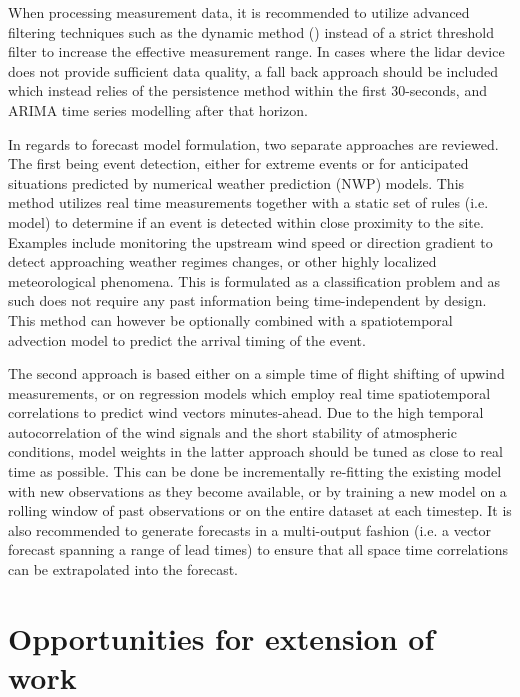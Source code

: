 When processing measurement data, it is recommended to utilize advanced filtering techniques such as the dynamic method (\cite{beck_dynamic_2017}) instead of a strict threshold filter to increase the effective measurement range. In cases where the lidar device does not provide sufficient data quality, a fall back approach should be included which instead relies of the persistence method within the first 30-seconds, and ARIMA time series modelling after that horizon.

In regards to forecast model formulation, two separate approaches are reviewed. The first being event detection, either for extreme events or for anticipated situations predicted by numerical weather prediction (NWP) models. This method utilizes real time measurements together with a static set of rules (i.e. model) to determine if an event is detected within close proximity to the site. Examples include monitoring the upstream wind speed or direction gradient to detect approaching weather regimes changes, or other highly localized meteorological phenomena. This is formulated as a classification problem and as such does not require any past information being time-independent by design. This method can however be optionally combined with a spatiotemporal advection model to predict the arrival timing of the event.

The second approach is based either on a simple time of flight shifting of upwind measurements, or on regression models which employ real time spatiotemporal correlations to predict wind vectors minutes-ahead. Due to the high temporal autocorrelation of the wind signals and the short stability of atmospheric conditions, model weights in the latter approach should be tuned as close to real time as possible. This can be done be incrementally re-fitting the existing model with new observations as they become available, or by training a new model on a rolling window of past observations or on the entire dataset at each timestep. It is also recommended to generate forecasts in a multi-output fashion (i.e. a vector forecast spanning a range of lead times) to ensure that all space time correlations can be extrapolated into the forecast.


\clearpage
\section{Opportunities for extension of work}
\label{sec:discussion_extension}

